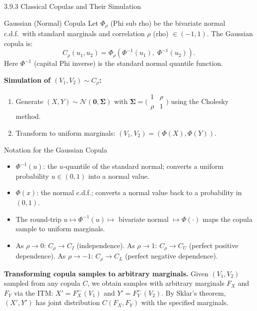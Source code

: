 \documentclass[aspectratio=169,10pt]{beamer}
\newcommand{\NN}{\mathcal{N}}
\begin{document}
\begin{frame}[allowframebreaks]{3.9.3 Classical Copulas and Their Simulation}

\begin{block}{Gaussian (Normal) Copula}
  Let $\Phi_\rho$ (Phi sub rho) be the bivariate normal c.d.f.\ with standard
  marginals and correlation $\rho$ (rho) $\in (-1, 1)$.  The Gaussian copula is:
  \[
    C_\rho(u_1, u_2) = \Phi_\rho(\Phi^{-1}(u_1),\; \Phi^{-1}(u_2)).
  \]
  Here $\Phi^{-1}$ (capital Phi inverse) is the standard normal quantile function.

  \textbf{Simulation of $(V_1, V_2) \sim C_\rho$:}
  \begin{enumerate}
    \item Generate $(X, Y) \sim \NN(\mathbf{0}, \boldsymbol{\Sigma})$ with
          $\boldsymbol{\Sigma} = \bigl(\begin{smallmatrix}1&\rho\\\rho&1\end{smallmatrix}\bigr)$
          using the Cholesky method.
    \item Transform to uniform marginals: $(V_1, V_2) = (\Phi(X), \Phi(Y))$.
  \end{enumerate}
\end{block}

\begin{block}{Notation for the Gaussian Copula}
  \begin{itemize}
    \item $\Phi^{-1}(u)$: the $u$-quantile of the standard normal; converts
      a uniform probability $u \in (0,1)$ into a normal value.
    \item $\Phi(x)$: the normal c.d.f.; converts a normal value back to a
      probability in $(0,1)$.
    \item The round-trip $u \mapsto \Phi^{-1}(u) \mapsto$ bivariate normal
      $\mapsto \Phi(\cdot)$ maps the copula sample to uniform marginals.
    \item As $\rho \to 0$: $C_\rho \to C_I$ (independence).
      As $\rho \to 1$: $C_\rho \to C_U$ (perfect positive dependence).
      As $\rho \to -1$: $C_\rho \to C_L$ (perfect negative dependence).
  \end{itemize}
\end{block}

\textbf{Transforming copula samples to arbitrary marginals.}
Given $(V_1, V_2)$ sampled from any copula $C$, we obtain samples with
arbitrary marginals $F_X$ and $F_Y$ via the ITM:
$X' = F_X^{\leftarrow}(V_1)$ and $Y' = F_Y^{\leftarrow}(V_2)$.
By Sklar's theorem, $(X', Y')$ has joint distribution $C(F_X, F_Y)$ with
the specified marginals.


\end{frame}
\end{document}
